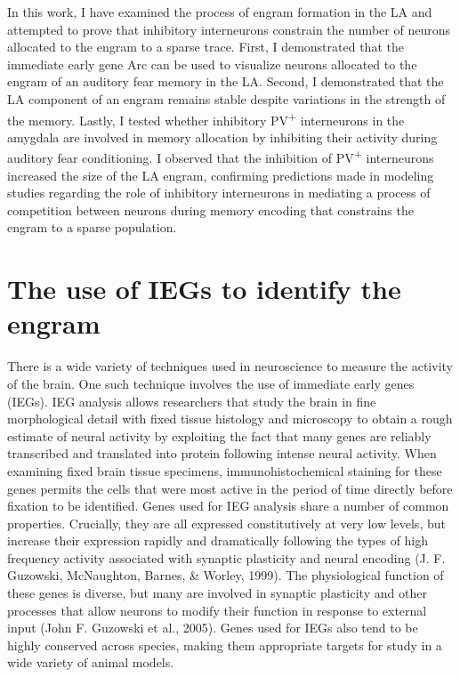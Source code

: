 \documentclass[12pt,a4paper,]{report}
\begin{document}
In this work, I have examined the process of engram formation in the LA
and attempted to prove that inhibitory interneurons constrain the number
of neurons allocated to the engram to a sparse trace. First, I
demonstrated that the immediate early gene Arc can be used to visualize
neurons allocated to the engram of an auditory fear memory in the LA.
Second, I demonstrated that the LA component of an engram remains stable
despite variations in the strength of the memory. Lastly, I tested
whether inhibitory PV\textsuperscript{+} interneurons in the amygdala
are involved in memory allocation by inhibiting their activity during
auditory fear conditioning. I observed that the inhibition of
PV\textsuperscript{+} interneurons increased the size of the LA engram,
confirming predictions made in modeling studies regarding the role of
inhibitory interneurons in mediating a process of competition between
neurons during memory encoding that constrains the engram to a sparse
population.

\section{The use of IEGs to identify the
engram}\label{the-use-of-iegs-to-identify-the-engram}

There is a wide variety of techniques used in neuroscience to measure
the activity of the brain. One such technique involves the use of
immediate early genes (IEGs). IEG analysis allows researchers that study
the brain in fine morphological detail with fixed tissue histology and
microscopy to obtain a rough estimate of neural activity by exploiting
the fact that many genes are reliably transcribed and translated into
protein following intense neural activity. When examining fixed brain
tissue specimens, immunohistochemical staining for these genes permits
the cells that were most active in the period of time directly before
fixation to be identified. Genes used for IEG analysis share a number of
common properties. Crucially, they are all expressed constitutively at
very low levels, but increase their expression rapidly and dramatically
following the types of high frequency activity associated with synaptic
plasticity and neural encoding (J. F. Guzowski, McNaughton, Barnes, \&
Worley, 1999). The physiological function of these genes is diverse, but
many are involved in synaptic plasticity and other processes that allow
neurons to modify their function in response to external input (John F.
Guzowski et al., 2005). Genes used for IEGs also tend to be highly
conserved across species, making them appropriate targets for study in a
wide variety of animal models.
\end{document}
